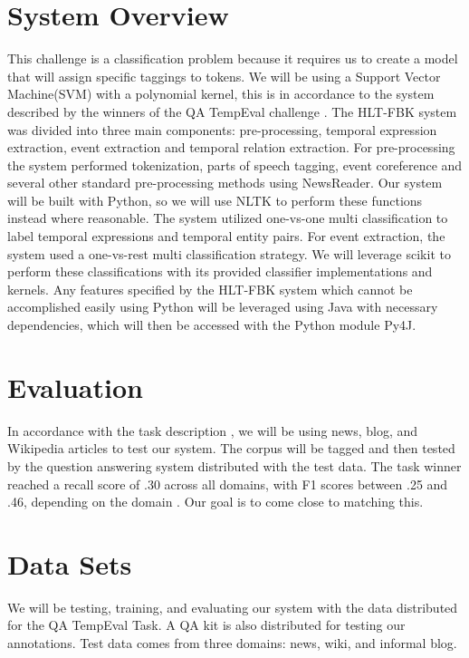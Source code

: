 \documentclass[11pt,letterpaper]{article}
\begin{document}
\section{System Overview}

This challenge is a classification problem because it requires us to create a model that will assign specific taggings to tokens. We will be using a Support Vector Machine(SVM) with a polynomial kernel, this is in accordance to the system described by the winners of the QA TempEval challenge \cite{Mirza:15}. The HLT-FBK system was divided into three main components: pre-processing, temporal expression extraction, event extraction and temporal relation extraction. For pre-processing the system performed tokenization, parts of speech tagging, event coreference and several other standard pre-processing methods using NewsReader. Our system will be built with Python, so we will use NLTK to perform these functions instead where reasonable. The system utilized one-vs-one multi classification to label temporal expressions and temporal entity pairs. For event extraction, the system used a one-vs-rest multi classification strategy. We will leverage scikit to perform these classifications with its provided classifier implementations and kernels. Any features specified by the HLT-FBK system which cannot be accomplished easily using Python will be leveraged using Java with necessary dependencies, which will then be accessed with the Python module Py4J.

\section{Evaluation}

In accordance with the task description \cite{Llorens:15}, we will be using news, blog, and Wikipedia articles to test our system. The corpus will be tagged and then tested by the question answering system distributed with the test data. The task winner reached a recall score of .30 across all domains, with F1 scores between .25 and .46, depending on the domain \cite{Mirza:15}. Our goal is to come close to matching this.

\section{Data Sets}

We will be testing, training, and evaluating our system with the data distributed for the QA TempEval Task. A QA kit is also distributed for testing our annotations. Test data comes from three domains: news, wiki, and informal blog. 
\end{document}
